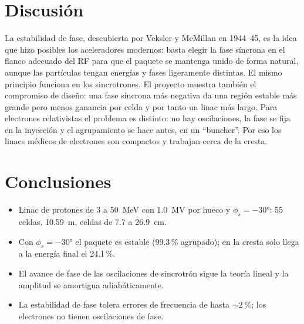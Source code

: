 \documentclass[11pt,a4paper]{article}
\begin{document}
\section{Discusión}

La estabilidad de fase, descubierta por Veksler y McMillan en 1944--45, es la idea que hizo posibles los aceleradores modernos:
basta elegir la fase síncrona en el flanco adecuado del RF para que el paquete se mantenga unido de forma natural, aunque las partículas
tengan energías y fases ligeramente distintas. El mismo principio funciona en los sincrotrones. El proyecto muestra también el compromiso
de diseño: una fase síncrona más negativa da una región estable más grande pero menos ganancia por celda y por tanto un linac más largo.
Para electrones relativistas el problema es distinto: no hay oscilaciones, la fase se fija en la inyección y el agrupamiento se hace antes,
en un ``buncher''. Por eso los linacs médicos de electrones son compactos y trabajan cerca de la cresta.

\section{Conclusiones}

\begin{itemize}
\item Linac de protones de \num{3} a \num{50}~MeV con \num{1.0}~MV por hueco y $\phi_s=-30°$: 55 celdas, \num{10.59}~m, celdas de \num{7.7} a \num{26.9}~cm.
\item Con $\phi_s=-30°$ el paquete es estable (\num{99.3}\,\% agrupado); en la cresta solo llega a la energía final el \num{24.1}\,\%.
\item El avance de fase de las oscilaciones de sincrotrón sigue la teoría lineal y la amplitud se amortigua adiabáticamente.
\item La estabilidad de fase tolera errores de frecuencia de hasta $\sim2~\%$; los electrones no tienen oscilaciones de fase.
\end{itemize}
\end{document}

